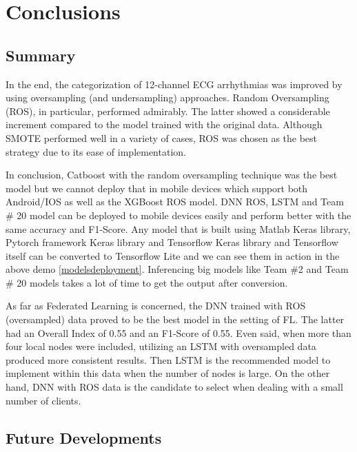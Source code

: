 \chapter{Conclusions} \label{chap6}

\section{Summary} \label{6summary}

In the end, the categorization of 12-channel ECG arrhythmias was improved by using oversampling (and undersampling) approaches. Random Oversampling (ROS), in particular, performed admirably. The latter showed a considerable increment compared to the model trained with the original data. Although SMOTE performed well in a variety of cases, ROS was chosen as the best strategy due to its ease of implementation.

In conclusion, Catboost with the random oversampling technique was the best model but we cannot deploy that in mobile devices which support both Android/IOS as well as the XGBoost ROS model. DNN ROS, LSTM and Team \# 20 model can be deployed to mobile devices easily and perform better with the same accuracy and F1-Score. Any model that is built using Matlab Keras library, Pytorch framework Keras library and Tensorflow Keras library and Tensorflow itself can be converted to Tensorflow Lite and we can see them in action in the above demo \ref{modelsdeployment}. Inferencing big models like Team \#2 and Team \# 20 models takes a lot of time to get the output after conversion. 

As far as Federated Learning is concerned, the DNN trained with ROS (oversampled) data proved to be the best model in the setting of FL. The latter had an Overall Index of 0.55 and an F1-Score of 0.55. Even said, when more than four local nodes were included, utilizing an LSTM with oversampled data produced more consistent results. Then LSTM is the recommended model to implement within this data when the number of nodes is large. On the other hand, DNN with ROS data is the candidate to select when dealing with a small number of clients.



\section{Future Developments} \label{6futuredevelopments}

